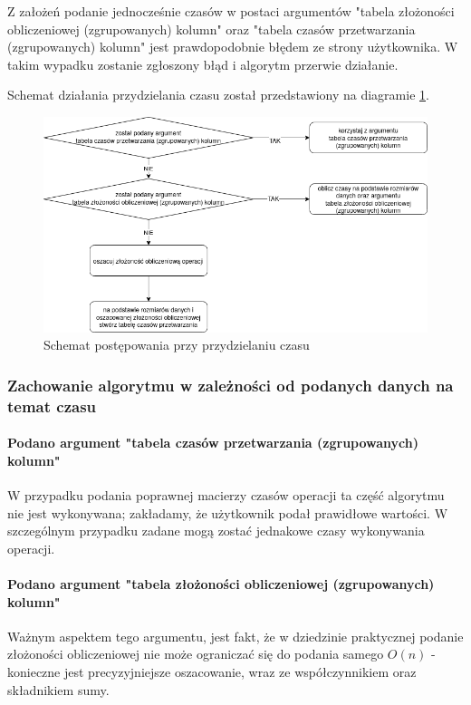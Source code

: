 \documentclass[brudnopis]{xmgr}
\begin{document}
Z założeń podanie jednocześnie czasów w postaci argumentów "tabela złożoności obliczeniowej (zgrupowanych) kolumn" oraz "tabela czasów przetwarzania (zgrupowanych) kolumn" jest prawdopodobnie błędem ze strony użytkownika. W takim wypadku zostanie zgłoszony błąd i algorytm przerwie działanie.

Schemat działania przydzielania czasu został przedstawiony na diagramie \ref{diag:time-assign}.

\begin{figure}[!tbh]
\centering
\includegraphics[width=.8\hsize]{fig/przydzielanie_czasow.png}
\caption{Schemat postępowania przy przydzielaniu czasu\label{diag:time-assign}}
\end{figure}

\subsubsection{Zachowanie algorytmu w zależności od podanych danych na temat czasu}

\paragraph{Podano argument "tabela czasów przetwarzania (zgrupowanych) kolumn"}

W przypadku podania poprawnej macierzy czasów operacji ta część algorytmu nie jest wykonywana; zakładamy, że użytkownik podał prawidłowe wartości. W szczególnym przypadku zadane mogą zostać jednakowe czasy wykonywania operacji.

\paragraph{Podano argument "tabela złożoności obliczeniowej (zgrupowanych) kolumn"}

Ważnym aspektem tego argumentu, jest fakt, że w dziedzinie praktycznej podanie złożoności obliczeniowej nie może ograniczać się do podania samego $O(n)$ - konieczne jest precyzyjniejsze oszacowanie, wraz ze współczynnikiem oraz składnikiem sumy.
\end{document}
